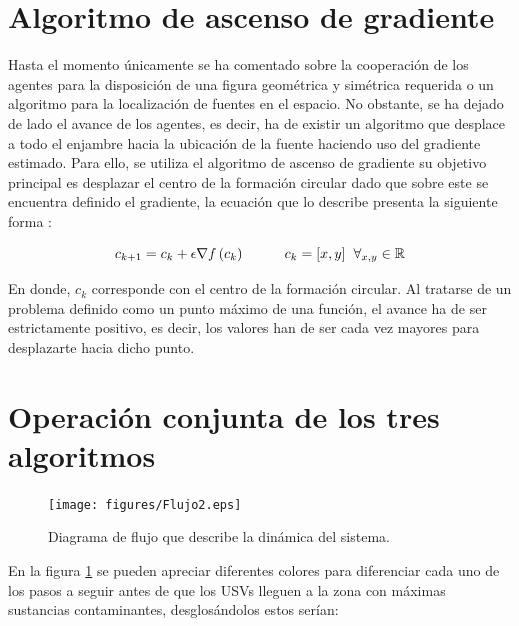 \section{Algoritmo de ascenso de gradiente}

Hasta el momento únicamente se ha comentado sobre la cooperación de los agentes para la disposición de una figura geométrica y simétrica requerida o un algoritmo para la localización de fuentes en el espacio. No obstante, se ha dejado de lado el avance de los agentes, es decir, ha de existir un algoritmo que desplace a todo el enjambre hacia la ubicación de la fuente haciendo uso del gradiente estimado.
\newpage
Para ello, se utiliza el algoritmo de ascenso de gradiente su objetivo principal es desplazar el centro de la formación circular dado que sobre este se encuentra definido el gradiente, la ecuación que lo describe presenta la siguiente forma \cite{Adicional_Estimacion_1}:

\begin{equation}\label{GA}
	c_{k+1}=c_k+\epsilon\nabla{f}\left(c_k\right)\hspace{10mm}c_k=[x,y]\hspace{2mm}\forall_{x,y}\in\mathbb{R}
\end{equation}

En donde, $c_k$ corresponde con el centro de la formación circular. Al tratarse de un problema definido como un punto máximo de una función, el avance ha de ser estrictamente positivo, es decir, los valores han de ser cada vez mayores para desplazarte hacia dicho punto.

\section{Operación conjunta de los tres algoritmos}

\begin{figure}[htb]
\centering
\texttt{[image: figures/Flujo2.eps]}
\caption{Diagrama de flujo que describe la dinámica del sistema.} \label{fig:Flujo}
\end{figure}

En la figura \ref{fig:Flujo} se pueden apreciar diferentes colores para diferenciar cada uno de los pasos a seguir antes de que los USVs lleguen a la zona con máximas sustancias contaminantes, desglosándolos estos serían:

